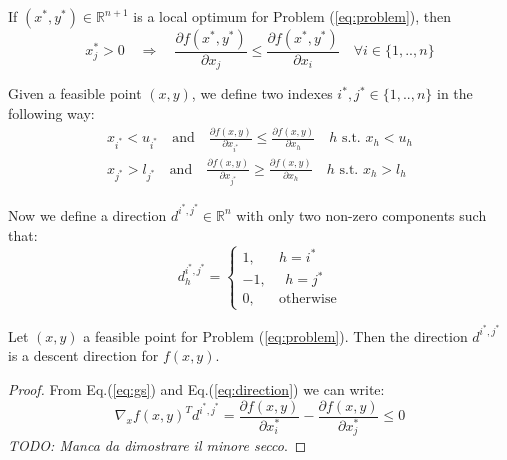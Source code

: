 \begin{corollary}
If $(x^*, y^*) \in \mathbb{R}^{n+1}$ is a local optimum for Problem (\ref{eq:problem}), then
\begin{equation}
x_j^* > 0 \quad \Rightarrow \quad \frac{\partial f(x^*, y^*)}{\partial x_j} \leq \frac{\partial f(x^*, y^*)}{\partial x_i} \quad \forall i \in \{1, .., n\}
\end{equation}
\end{corollary}
Given a feasible point $(x,y)$, we define two indexes $i^*, j^* \in \{1, .., n\}$ in the following way:
\begin{subequations}\label{eq:gs}
\begin{align}
x_{i^*} < u_{i^*} \quad \text{and} \quad  \frac{\partial f(x,y)}{\partial x_{i^*}}\leq \frac{\partial f(x,y)}{\partial x_h} \quad h \text{ s.t. } x_h < u_h \\
x_{j^*} > l_{j^*} \quad \text{and} \quad  \frac{\partial f(x,y)}{\partial x_{j^*}}\geq \frac{\partial f(x,y)}{\partial x_h} \quad h \text{ s.t. } x_h > l_h 
\end{align}
\end{subequations}

\hspace{-1.8em} Now we define a direction $d^{i^*,j^*} \in \mathbb{R}^n$ with only two non-zero components such that:
\begin{equation}\label{eq:direction}
d^{i^*,j^*}_h = 
\begin{cases}
1, \quad \text{    } h=i^*\\
-1, \text{    } \text{    } h=j^*\\
0, \quad \text{    } \text{otherwise}
\end{cases}
\end{equation}

\begin{proposition}
Let $(x,y)$ a feasible point for Problem (\ref{eq:problem}). Then the direction $d^{i^*,j^*}$ is a descent direction for $f(x,y)$.
\end{proposition}
\begin{proof}
From Eq.(\ref{eq:gs}) and Eq.(\ref{eq:direction}) we can write:
\begin{equation}
\nabla_x f(x,y)^T d^{i^*,j^*} = \frac{\partial f(x, y)}{\partial x_i^*} - \frac{\partial f(x, y)}{\partial x_j^*} \leq 0
\end{equation}
\textit{TODO: Manca da dimostrare il minore secco}.
\end{proof}

